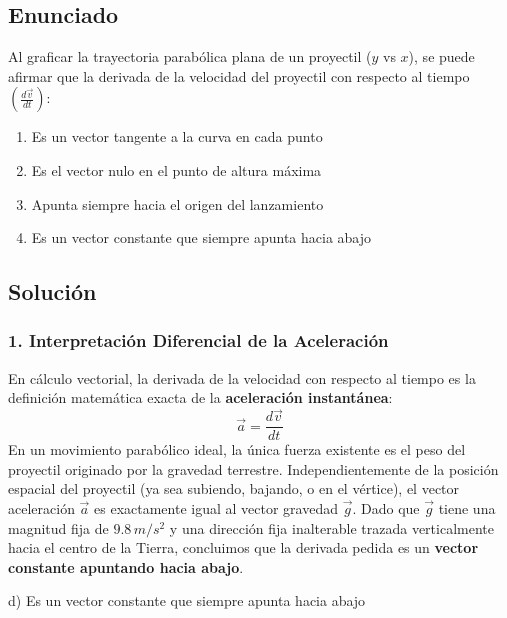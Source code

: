\documentclass[12pt, a4paper]{article}
\begin{document}
\newpage

\subsection*{Enunciado}
Al graficar la trayectoria parabólica plana de un proyectil ($y$ vs $x$), se puede afirmar que la derivada de la velocidad del proyectil con respecto al tiempo $\left(\frac{d\vec{v}}{dt}\right)$:
\begin{enumerate}[label=\alph*)]
    \item Es un vector tangente a la curva en cada punto
    \item Es el vector nulo en el punto de altura máxima
    \item Apunta siempre hacia el origen del lanzamiento
    \item Es un vector constante que siempre apunta hacia abajo
\end{enumerate}

\subsection*{Solución}

\subsubsection*{1. Interpretación Diferencial de la Aceleración}
En cálculo vectorial, la derivada de la velocidad con respecto al tiempo es la definición matemática exacta de la \textbf{aceleración instantánea}:
$$ \vec{a} = \frac{d\vec{v}}{dt} $$
En un movimiento parabólico ideal, la única fuerza existente es el peso del proyectil originado por la gravedad terrestre.
Independientemente de la posición espacial del proyectil (ya sea subiendo, bajando, o en el vértice), el vector aceleración $\vec{a}$ es exactamente igual al vector gravedad $\vec{g}$.
Dado que $\vec{g}$ tiene una magnitud fija de $9.8\,\si{m/s^2}$ y una dirección fija inalterable trazada verticalmente hacia el centro de la Tierra, concluimos que la derivada pedida es un \textbf{vector constante apuntando hacia abajo}.

\begin{tcolorbox}[colback=green!5!white, colframe=green!50!black, title=Respuesta Final]
\centering \Large d) Es un vector constante que siempre apunta hacia abajo
\end{tcolorbox}

\newpage
\end{document}
